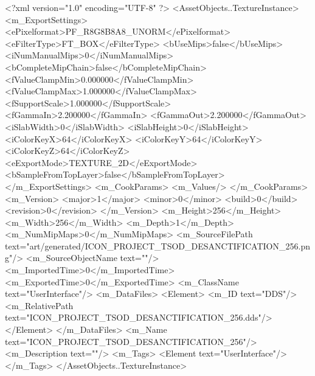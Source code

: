 <?xml version="1.0" encoding="UTF-8" ?>
<AssetObjects..TextureInstance>
	<m_ExportSettings>
		<ePixelformat>PF_R8G8B8A8_UNORM</ePixelformat>
		<eFilterType>FT_BOX</eFilterType>
		<bUseMips>false</bUseMips>
		<iNumManualMips>0</iNumManualMips>
		<bCompleteMipChain>false</bCompleteMipChain>
		<fValueClampMin>0.000000</fValueClampMin>
		<fValueClampMax>1.000000</fValueClampMax>
		<fSupportScale>1.000000</fSupportScale>
		<fGammaIn>2.200000</fGammaIn>
		<fGammaOut>2.200000</fGammaOut>
		<iSlabWidth>0</iSlabWidth>
		<iSlabHeight>0</iSlabHeight>
		<iColorKeyX>64</iColorKeyX>
		<iColorKeyY>64</iColorKeyY>
		<iColorKeyZ>64</iColorKeyZ>
		<eExportMode>TEXTURE_2D</eExportMode>
		<bSampleFromTopLayer>false</bSampleFromTopLayer>
	</m_ExportSettings>
	<m_CookParams>
		<m_Values/>
	</m_CookParams>
	<m_Version>
		<major>1</major>
		<minor>0</minor>
		<build>0</build>
		<revision>0</revision>
	</m_Version>
	<m_Height>256</m_Height>
	<m_Width>256</m_Width>
	<m_Depth>1</m_Depth>
	<m_NumMipMaps>0</m_NumMipMaps>
	<m_SourceFilePath text="art/generated/ICON_PROJECT_TSOD_DESANCTIFICATION_256.png"/>
	<m_SourceObjectName text=""/>
	<m_ImportedTime>0</m_ImportedTime>
	<m_ExportedTime>0</m_ExportedTime>
	<m_ClassName text="UserInterface"/>
	<m_DataFiles>
		<Element>
			<m_ID text="DDS"/>
			<m_RelativePath text="ICON_PROJECT_TSOD_DESANCTIFICATION_256.dds"/>
		</Element>
	</m_DataFiles>
	<m_Name text="ICON_PROJECT_TSOD_DESANCTIFICATION_256"/>
	<m_Description text=""/>
	<m_Tags>
		<Element text="UserInterface"/>
	</m_Tags>
</AssetObjects..TextureInstance>
